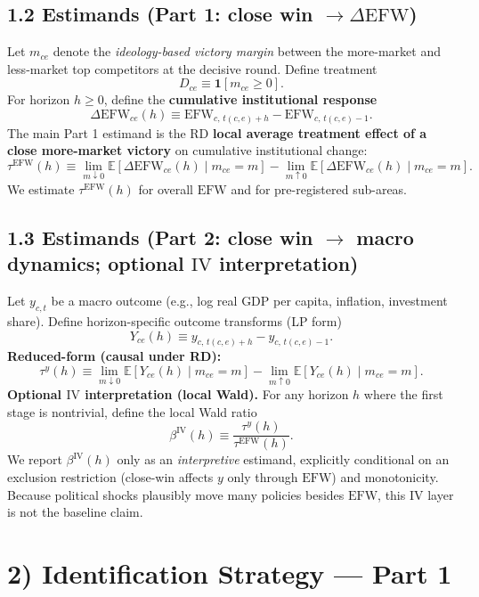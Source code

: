 \documentclass[11pt]{article}
\newcommand{\EFW}{\mathrm{EFW}}
\newcommand{\IV}{\mathrm{IV}}
\newcommand{\E}{\mathbb{E}}
\newcommand{\1}{\mathbf{1}}
\newcommand{\RDcut}{0}
\newcommand{\cid}{c}
\newcommand{\eid}{e}
\begin{document}
\subsection*{1.2 Estimands (Part 1: close win $\rightarrow \Delta \EFW$)}
Let $m_{\cid \eid}$ denote the \emph{ideology-based victory margin} between the more-market and less-market top competitors at the decisive round. Define treatment
\[
D_{\cid \eid} \equiv \1[m_{\cid \eid}\ge \RDcut].
\]
For horizon $h\ge 0$, define the \textbf{cumulative institutional response}
\[
\Delta \EFW_{\cid \eid}(h) \equiv \EFW_{\cid,\, t(\cid,\eid)+h} - \EFW_{\cid,\, t(\cid,\eid)-1}.
\]
The main Part 1 estimand is the RD \textbf{local average treatment effect of a close more-market victory} on cumulative institutional change:
\[
\tau^{\EFW}(h) \equiv \lim_{m\downarrow 0}\E[\Delta \EFW_{\cid \eid}(h)\mid m_{\cid \eid}=m] - \lim_{m\uparrow 0}\E[\Delta \EFW_{\cid \eid}(h)\mid m_{\cid \eid}=m].
\]
We estimate $\tau^{\EFW}(h)$ for overall $\EFW$ and for pre-registered sub-areas.

\subsection*{1.3 Estimands (Part 2: close win $\rightarrow$ macro dynamics; optional $\IV$ interpretation)}
Let $y_{\cid,t}$ be a macro outcome (e.g., log real GDP per capita, inflation, investment share). Define horizon-specific outcome transforms (LP form)
\[
Y_{\cid \eid}(h) \equiv y_{\cid,\, t(\cid,\eid)+h} - y_{\cid,\, t(\cid,\eid)-1}.
\]
\textbf{Reduced-form (causal under RD):}
\[
\tau^{y}(h) \equiv \lim_{m\downarrow 0}\E[Y_{\cid \eid}(h)\mid m_{\cid \eid}=m] - \lim_{m\uparrow 0}\E[Y_{\cid \eid}(h)\mid m_{\cid \eid}=m].
\]
\textbf{Optional $\IV$ interpretation (local Wald).} For any horizon $h$ where the first stage is nontrivial, define the local Wald ratio
\[
\beta^{\IV}(h) \equiv \frac{\tau^{y}(h)}{\tau^{\EFW}(h)}.
\]
We report $\beta^{\IV}(h)$ only as an \emph{interpretive} estimand, explicitly conditional on an exclusion restriction (close-win affects $y$ only through $\EFW$) and monotonicity. Because political shocks plausibly move many policies besides $\EFW$, this $\IV$ layer is not the baseline claim.

\section*{2) Identification Strategy --- Part 1}
\end{document}

